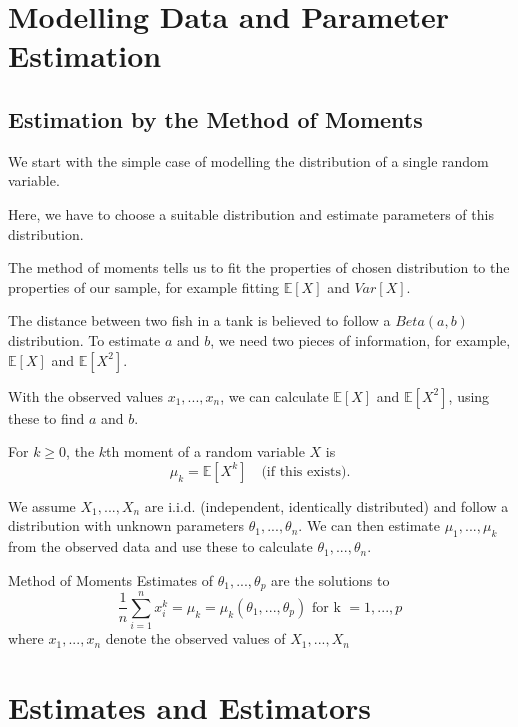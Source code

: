 \section{Modelling Data and Parameter Estimation}

\subsection{Estimation by the Method of Moments}

We start with the simple case of modelling the distribution of a single random variable.

Here, we have to choose a suitable distribution and estimate parameters of this distribution.

The method of moments tells us to fit the properties of chosen distribution to the properties of our sample, for example fitting $\mathbb{E}[X]$ and $Var[X]$.

\begin{example}
  The distance between two fish in a tank is believed to follow a $Beta(a, b)$ distribution. To estimate $a$ and $b$, we need two pieces of information, for example, $\mathbb{E}[X]$ and $\mathbb{E}[X^2]$.

  With the observed values $x_1, ..., x_n$, we can calculate $\mathbb{E}[X]$ and $\mathbb{E}[X^2]$, using these to find $a$ and $b$.
\end{example}

\begin{definition}
    For $k \geq 0$, the $k$th moment of a random variable $X$ is
    \[\mu_k = \mathbb{E}[X^k] \quad \text{(if this exists)}.\]

\end{definition}
We assume $X_1, ..., X_n$ are i.i.d. (independent, identically distributed) and follow a distribution with unknown parameters $\theta_1,...,\theta_n$. We can then estimate $\mu_1,...,\mu_k$ from the observed data and use these to calculate $\theta_1,...,\theta_n$.

\begin{definition}
    Method of Moments Estimates of $\theta_1,...,\theta_p$ are the solutions to
    \[\frac{1}{n} \sum_{i=1}^n x_i^k = \mu_k = \mu_k(\theta_1,...,\theta_p) \text{ for k } = 1,...,p\]
    where $x_1,...,x_n$ denote the observed values of $X_1,...,X_n$
\end{definition}

\section{Estimates and Estimators}

